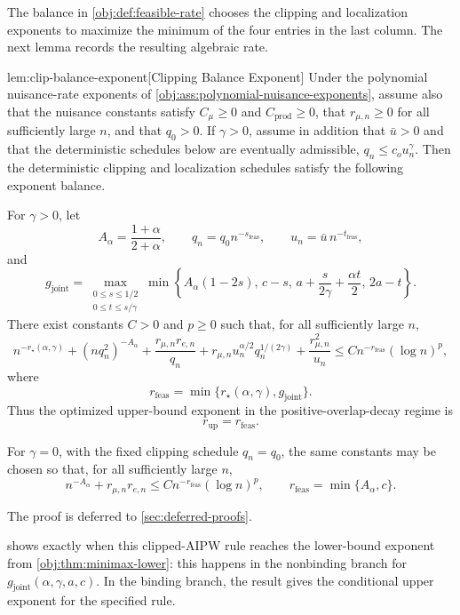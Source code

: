 \documentclass[11pt]{article}
\begin{document}
The balance in \cref{obj:def:feasible-rate} chooses the clipping and localization exponents to maximize the minimum of the four entries in the last column.  The next lemma records the resulting algebraic rate.

\begin{lemmav}{lem:clip-balance-exponent}[Clipping Balance Exponent]
Under the polynomial nuisance-rate exponents of \cref{obj:ass:polynomial-nuisance-exponents}, assume also that the nuisance constants satisfy \(C_\mu\ge0\) and \(C_{\mathrm{prod}}\ge0\), that \(r_{\mu,n}\ge0\) for all sufficiently large \(n\), and that \(q_0>0\).  If \(\gamma>0\), assume in addition that \(\bar u>0\) and that the deterministic schedules below are eventually admissible, \(q_n\le c_o u_n^\gamma\).  Then the deterministic clipping and localization schedules satisfy the following exponent balance.

For \(\gamma>0\), let
\[
A_\alpha=\frac{1+\alpha}{2+\alpha},
\qquad
q_n=q_0 n^{-s_{\mathrm{feas}}},
\qquad
u_n=\bar u\, n^{-t_{\mathrm{feas}}},
\]
and
\[
g_{\mathrm{joint}}
=
\max_{\substack{0\le s\le 1/2\\ 0\le t\le s/\gamma}}
\min\left\{
A_\alpha(1-2s),\,
c-s,\,
a+\frac{s}{2\gamma}+\frac{\alpha t}{2},\,
2a-t
\right\}.
\]
There exist constants \(C>0\) and \(p\ge0\) such that, for all sufficiently large \(n\),
\[
 n^{-r_\star(\alpha,\gamma)}
 + (nq_n^2)^{-A_\alpha}
 + \frac{r_{\mu,n}r_{e,n}}{q_n}
 + r_{\mu,n}u_n^{\alpha/2}q_n^{1/(2\gamma)}
 + \frac{r_{\mu,n}^2}{u_n}
\le
C n^{-r_{\mathrm{feas}}}(\log n)^p,
\]
where
\[
r_{\mathrm{feas}}
=
\min\{r_\star(\alpha,\gamma),g_{\mathrm{joint}}\}.
\]
Thus the optimized upper-bound exponent in the positive-overlap-decay regime is
\[
r_{\mathrm{up}}=r_{\mathrm{feas}}.
\]

For \(\gamma=0\), with the fixed clipping schedule \(q_n=q_0\), the same constants may be chosen so that, for all sufficiently large \(n\),
\[
n^{-A_\alpha}+r_{\mu,n}r_{e,n}
\le
C n^{-r_{\mathrm{feas}}}(\log n)^p,
\qquad
r_{\mathrm{feas}}=\min\{A_\alpha,c\}.
\]
\end{lemmav}

The proof is deferred to \cref{sec:deferred-proofs}.

 shows exactly when this clipped-AIPW rule reaches the lower-bound exponent from \cref{obj:thm:minimax-lower}: this happens in the nonbinding branch for \(g_{\mathrm{joint}}(\alpha,\gamma,a,c)\).  In the binding branch, the result gives the conditional upper exponent for the specified rule.
\end{document}
